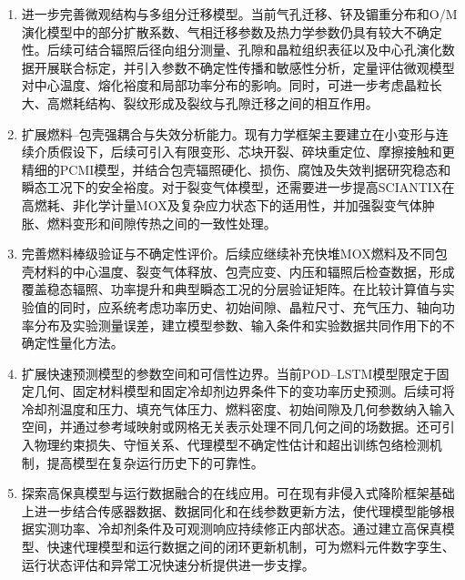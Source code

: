\begin{enumerate}[label={（\arabic*）},leftmargin=2.8em]
	\item 进一步完善微观结构与多组分迁移模型。当前气孔迁移、钚及镅重分布和O/M演化模型中的部分扩散系数、气相迁移参数及热力学参数仍具有较大不确定性。后续可结合辐照后径向组分测量、孔隙和晶粒组织表征以及中心孔演化数据开展联合标定，并引入参数不确定性传播和敏感性分析，定量评估微观模型对中心温度、熔化裕度和局部功率分布的影响。同时，可进一步考虑晶粒长大、高燃耗结构、裂纹形成及裂纹与孔隙迁移之间的相互作用。

	\item 扩展燃料--包壳强耦合与失效分析能力。现有力学框架主要建立在小变形与连续介质假设下，后续可引入有限变形、芯块开裂、碎块重定位、摩擦接触和更精细的PCMI模型，并结合包壳辐照硬化、损伤、腐蚀及失效判据研究稳态和瞬态工况下的安全裕度。对于裂变气体模型，还需要进一步提高SCIANTIX在高燃耗、非化学计量MOX及复杂应力状态下的适用性，并加强裂变气体肿胀、燃料变形和间隙传热之间的一致性处理。

	\item 完善燃料棒级验证与不确定性评价。后续应继续补充快堆MOX燃料及不同包壳材料的中心温度、裂变气体释放、包壳应变、内压和辐照后检查数据，形成覆盖稳态辐照、功率提升和典型瞬态工况的分层验证矩阵。在比较计算值与实验值的同时，应系统考虑功率历史、初始间隙、晶粒尺寸、充气压力、轴向功率分布及实验测量误差，建立模型参数、输入条件和实验数据共同作用下的不确定性量化方法。

	\item 扩展快速预测模型的参数空间和可信性边界。当前POD--LSTM模型限定于固定几何、固定材料模型和固定冷却剂边界条件下的变功率历史预测。后续可将冷却剂温度和压力、填充气体压力、燃料密度、初始间隙及几何参数纳入输入空间，并通过参考域映射或网格无关表示处理不同几何之间的场数据。还可引入物理约束损失、守恒关系、代理模型不确定性估计和超出训练包络检测机制，提高模型在复杂运行历史下的可靠性。

	\item 探索高保真模型与运行数据融合的在线应用。可在现有非侵入式降阶框架基础上进一步结合传感器数据、数据同化和在线参数更新方法，使代理模型能够根据实测功率、冷却剂条件及可观测响应持续修正内部状态。通过建立高保真模型、快速代理模型和运行数据之间的闭环更新机制，可为燃料元件数字孪生、运行状态评估和异常工况快速分析提供进一步支撑。
\end{enumerate}

